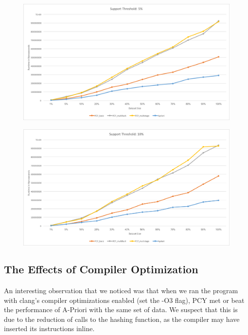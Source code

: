 \documentclass[11pt,letterpaper,titlepage]{article}
\begin{document}
		\begin{figure}[H]
			\includegraphics[width=\textwidth]{st5}
		\end{figure}

		\begin{figure}[H]
			\includegraphics[width=\textwidth]{st10}
		\end{figure}

		\subsection{The Effects of Compiler Optimization}
		\paragraph{}
			An interesting observation that we noticed was that when we ran the
			program with clang's compiler optimizations enabled (set the -O3
			flag), PCY met or beat the performance of A-Priori with the same set
			of data. We suspect that this is due to the reduction of calls to
			the hashing function, as the compiler may have inserted its
			instructions inline.
\end{document}
